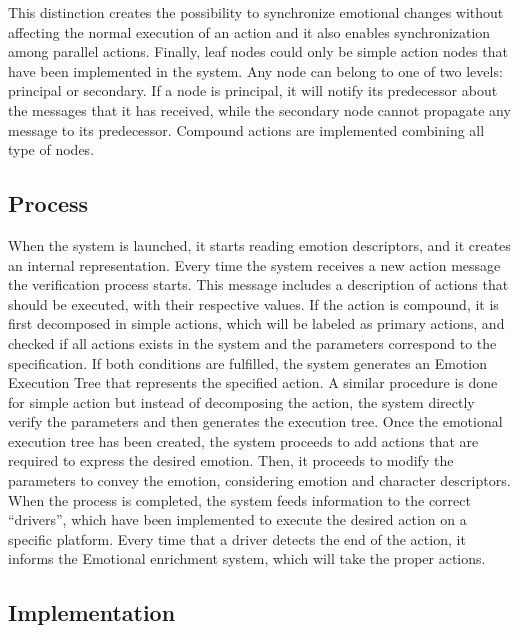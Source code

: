 \documentclass{sig-alternate-05-2015}
\begin{document}
This distinction creates the possibility to synchronize emotional changes without affecting the normal execution of an action and it also enables synchronization among parallel actions. Finally, leaf nodes could only be simple action nodes that have been implemented in the system. Any node can belong to one of two levels: principal or  secondary. If a node is principal, it will notify its predecessor about the messages that it has received, while the secondary node cannot propagate any message to its predecessor. Compound actions are implemented combining all type of nodes. 

\subsection{Process}

When the system is launched, it starts reading emotion descriptors, and it creates an internal representation. Every time the system receives a new action message the verification process starts. This message includes a description of actions that should be executed, with their respective values. If the action is compound, it is first decomposed in simple actions, which will be labeled as primary actions, and checked if all actions exists in the system and the parameters correspond to the specification. If both conditions are fulfilled, the system generates an Emotion Execution Tree that represents the specified action. A similar procedure is done for simple action but instead of decomposing the action, the system directly verify the parameters and then generates the execution tree. Once the emotional execution tree has been created, the system proceeds to add actions that are required to express the desired emotion. Then, it proceeds to modify the parameters to convey the emotion, considering emotion and character descriptors. When the process is completed, the system feeds information to the correct ``drivers'', which have been implemented to execute the desired action on a specific platform. Every time that a driver detects the end of the action, it informs the Emotional enrichment system, which will take the proper actions.

\subsection{Implementation}
\end{document}
